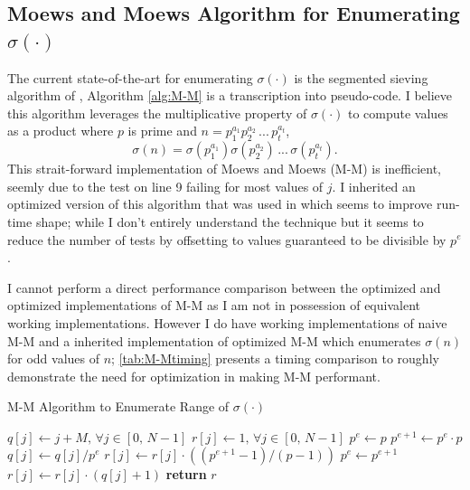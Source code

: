 \documentclass{article}
\theoremstyle{definition}
\begin{document}
\subsection{Moews and Moews Algorithm for Enumerating $\sigma(\cdot)$}
The current state-of-the-art for enumerating $\sigma(\cdot)$ is the segmented sieving algorithm of \cite{moews_moews_1991}, Algorithm \autoref{alg:M-M} is a transcription into pseudo-code. I believe this algorithm leverages the multiplicative property of $\sigma(\cdot)$ \cite{2021Multiplicative} to compute values as a product where $p$ is prime and $n =p^{a_1}_{1}p^{a_2}_{2}\,...\, p^{a_t}_{t}$, $$\sigma(n) = \sigma(p^{a_1}_{1}) \sigma(p^{a_2}_{2}) \,...\,\sigma(p^{a_t}_{t}).$$  This strait-forward implementation of Moews and Moews (M-M) is inefficient, seemly due to the test on line 9 failing for most values of $j$. I inherited an optimized version of this algorithm that was used in \cite{chum_guy_jacobson_mosunov_2018} which seems to improve run-time shape; while I don't entirely understand the technique but it seems to reduce the number of tests by offsetting to values guaranteed to be divisible by $p^e$.

I cannot perform a direct performance comparison between the optimized and optimized implementations of M-M as I am not in possession of equivalent working implementations. However I do have working implementations of naive M-M and a inherited implementation of optimized M-M which enumerates $\sigma(n)$ for odd values of $n$; \autoref{tab:M-Mtiming} presents a timing comparison to roughly demonstrate the need for optimization in making M-M performant.   

\begin{algorithm}[H]
\caption{M-M Algorithm to Enumerate Range of $\sigma(\cdot)$} 
\begin{algorithmic}[1]
     
    \State $q[j] \gets j + M,\, \forall j \in [0,\, N-1]$
    \State $r[j] \gets 1,\, \forall j \in [0,\,  N-1]$
        \State $p^e \gets p$
            \State $p^{e+1} \gets p^e \cdot p$
                    \State $q[j] \gets q[j] / p^e$
                    \State $r[j] \gets r[j] \cdot ((p^{e+1} - 1) / (p - 1))$ 
                \EndIf
            \EndFor
            \State $p^e \gets p^{e+1}$
        \EndWhile
    \EndFor
            \State $r[j] \gets r[j] \cdot (q[j] + 1)$
        \EndIf
    \EndFor
    \State \textbf{return} $r$
    \EndProcedure
\end{algorithmic}
\label{alg:M-M}
\end{algorithm}
\end{document}

